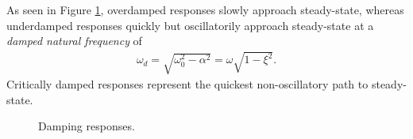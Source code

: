 \documentclass{report}
\begin{document}
\\ \\
As seen in Figure \ref{damping}, overdamped responses slowly approach steady-state, whereas underdamped responses quickly but oscillatorily approach steady-state at a \emph{damped natural frequency} of 
\begin{align}
    \omega_d = \sqrt{\omega_0^2-\alpha^2} = \omega\sqrt{1-\xi^2}.
\end{align}
Critically damped responses represent the quickest non-oscillatory path to steady-state. 
\begin{figure}
    \caption{Damping responses.}
    \label{damping}
    \centering
    \resizebox{0.65\textwidth}{!}{%
        
    }
\end{figure}
\end{document}
